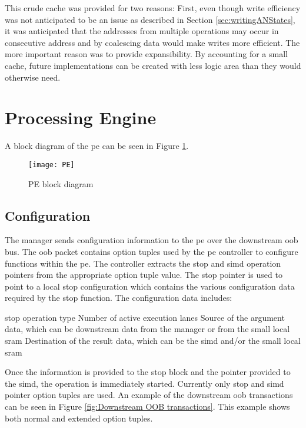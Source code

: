 This crude cache was provided for two reasons: First, even though write efficiency was not anticipated to be an issue as described in Section \ref{sec:writingANStates}, it was anticipated that the addresses from multiple operations may occur in consecutive address and by coalescing data would make writes more efficient.
The more important reason was to provide expansibility. By accounting for a small cache, future implementations can be created with less logic area than they would otherwise need.


\section{Processing Engine}
\label{sec:pe}

A block diagram of the \ac{pe} can be seen in Figure \ref{fig:PE block diagram}.
\begin{figure}[h]
\centering
\captionsetup{justification=centering}
\captionsetup{width=.9\linewidth}
\centerline{
\mbox{\texttt{[image: PE]}}
}
\center\caption{PE block diagram}
\label{fig:PE block diagram}
\end{figure}

\subsection{Configuration}
\label{sec:peConfiguration}

The manager sends configuration information to the \ac{pe} over the downstream \ac{oob} bus.
The \ac{oob} packet contains option tuples used by the \ac{pe} controller to configure functions within the \ac{pe}.
The controller extracts the \ac{stop} and \ac{simd} operation pointers from the appropriate option tuple value.
The \ac{stop} pointer is used to point to a local \ac{stop} configuration which contains the various configuration data required by the \ac{stop} function.
The configuration data includes:
\begin{outline}
    \1 \ac{stop} operation type
    \1 Number of active execution lanes
    \1 Source of the argument data, which can be downstream data from the manager or from the small local \ac{sram}
    \1 Destination of the result data, which can be the \ac{simd} and/or the small local \ac{sram}
\end{outline}
Once the information is provided to the \ac{stop} block and the pointer provided to the \ac{simd}, the operation is immediately started.
Currently only \ac{stop} and \ac{simd} pointer option tuples are used.
An example of the downstream \ac{oob} transactions can be seen in Figure \ref{fig:Downstream OOB transactions}. This example shows both normal and extended option tuples.

